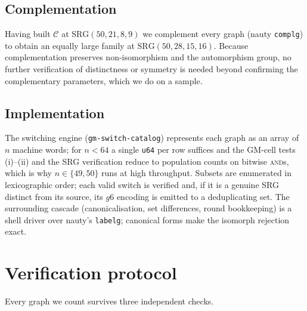 \documentclass[11pt]{article}
\theoremstyle{definition}
\newcommand{\SRG}[1]{\mathrm{SRG}(#1)}
\begin{document}
\subsection{Complementation}

Having built $\mathcal{C}$ at $\SRG{50,21,8,9}$ we complement every graph (nauty
\texttt{complg}) to obtain an equally large family at $\SRG{50,28,15,16}$. Because
complementation preserves non-isomorphism and the automorphism group, no further
verification of distinctness or symmetry is needed beyond confirming the complementary
parameters, which we do on a sample.

\subsection{Implementation}\label{sec:impl}

The switching engine (\texttt{gm-switch-catalog}) represents each graph as an array of
$n$ machine words; for $n<64$ a single \texttt{u64} per row suffices and the GM-cell tests
(i)--(ii) and the SRG verification reduce to population counts on bitwise
\textsc{and}s, which is why $n\in\{49,50\}$ runs at high throughput. Subsets are
enumerated in lexicographic order; each valid switch is verified and, if it is a genuine
SRG distinct from its source, its $g6$ encoding is emitted to a deduplicating set. The
surrounding cascade (canonicalisation, set differences, round bookkeeping) is a shell
driver over nauty's \texttt{labelg}; canonical forms make the isomorph rejection exact.

\section{Verification protocol}\label{sec:verify}

Every graph we count survives three independent checks.
\end{document}
